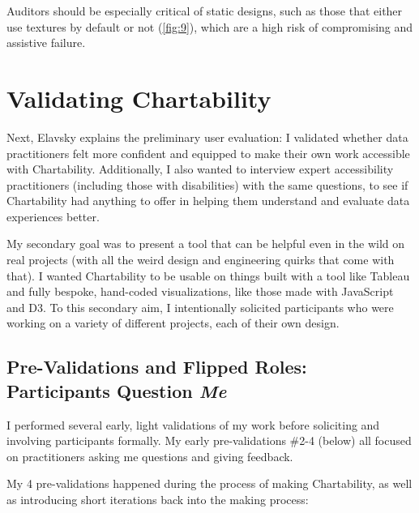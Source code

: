 \documentclass{egpubl}
\begin{document}
Auditors should be especially critical of static designs, such as those that either use textures by default or not (\autoref{fig:9}), which are a high risk of compromising and assistive failure.

\section{Validating Chartability}

Next, Elavsky explains the preliminary user evaluation: I validated whether data practitioners felt more confident and equipped to make their own work accessible with Chartability. Additionally, I also wanted to interview expert accessibility practitioners (including those with disabilities) with the same questions, to see if Chartability had anything to offer in helping them understand and evaluate data experiences better. 

My secondary goal was to present a tool that can be helpful even in the wild on real projects (with all the weird design and engineering quirks that come with that). I wanted Chartability to be usable on things built with a tool like Tableau and fully bespoke, hand-coded visualizations, like those made with JavaScript and D3. To this secondary aim, I intentionally solicited participants who were working on a variety of different projects, each of their own design. 

\subsection{Pre-Validations and Flipped Roles: Participants Question \emph{Me}}

I performed several early, light validations of my work before soliciting and involving participants formally. My early pre-validations \#2-4 (below) all focused on practitioners asking me questions and giving feedback. 

My 4 pre-validations happened during the process of making Chartability, as well as introducing short iterations back into the making process: 
\end{document}
